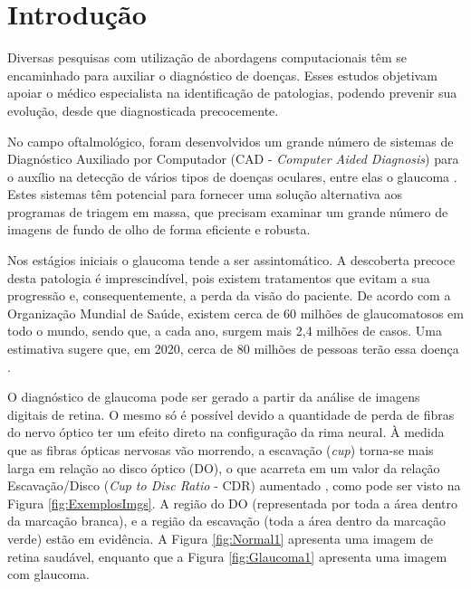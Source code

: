 \documentclass[fleqn,10pt]{SelfArx} %
\affiliation{\textsuperscript{1}\textit{Departamento de Computação, Federal University of Piauí, Brazil}} %
\affiliation{\textsuperscript{2}\textit{Curso de Sistemas de Informação, Federal University of Piauí, Brazil}} %
\affiliation{*\textbf{Corresponding author}: claromaila@gmail.com} %
\begin{document}
	
	\setcounter{page}{82}
	
	\flushbottom %
	\maketitle %
	\thispagestyle{empty} %
	
	
	





\section{Introdução}
Diversas pesquisas com utilização de abordagens computacionais têm se encaminhado para auxiliar o diagnóstico de doenças. Esses estudos objetivam apoiar o médico especialista na identificação de patologias, podendo prevenir sua evolução, desde que diagnosticada precocemente.

No campo oftalmológico, foram desenvolvidos um grande número de sistemas de Diagnóstico Auxiliado por Computador (CAD - \textit{Computer Aided Diagnosis}) para o auxílio na detecção de vários tipos de doenças oculares, entre elas o glaucoma \cite{usman2016computer}. Estes sistemas têm potencial para fornecer uma solução alternativa aos programas de triagem em massa, que precisam examinar um grande número de imagens de fundo de olho de forma eficiente e robusta.

Nos estágios iniciais o glaucoma tende a ser assintomático. A descoberta precoce desta patologia é imprescindível, pois existem tratamentos que evitam a sua progressão e, consequentemente, a perda da visão do paciente. De acordo com a Organização Mundial de Saúde, existem cerca de 60 milhões de glaucomatosos em todo o mundo, sendo que, a cada ano, surgem mais 2,4 milhões de casos. Uma estimativa sugere que, em 2020, cerca de 80 milhões de pessoas terão essa doença \cite{Quigley:2006}.

O diagnóstico de glaucoma pode ser gerado a partir da análise de imagens digitais de retina. O mesmo só é possível devido a quantidade de perda de fibras do nervo óptico ter um efeito direto na configuração da rima neural. À medida que as fibras ópticas nervosas vão morrendo, a escavação (\textit{cup}) torna-se mais larga em relação ao disco óptico (DO), o que acarreta em um valor da relação Escavação/Disco (\textit{Cup to Disc Ratio} - CDR) aumentado \cite{Mittapalli:2016}, como pode ser visto na Figura \ref{fig:ExemplosImgs}. A região do DO (representada por toda a área dentro da marcação branca), e a região da escavação (toda a área dentro da marcação verde) estão em evidência. A Figura \ref{fig:Normal1} apresenta uma imagem de retina saudável, enquanto que a Figura \ref{fig:Glaucoma1} apresenta uma imagem com glaucoma.
\end{document}
